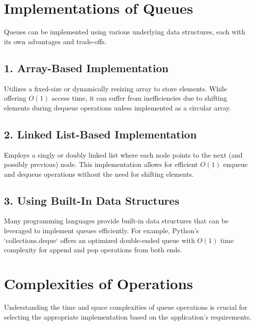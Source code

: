 \section{Implementations of Queues}

Queues can be implemented using various underlying data structures, each with its own advantages and trade-offs.

\subsection*{1. Array-Based Implementation}
Utilizes a fixed-size or dynamically resizing array to store elements. While offering \(O(1)\) access time, it can suffer from inefficiencies due to shifting elements during dequeue operations unless implemented as a circular array.

\subsection*{2. Linked List-Based Implementation}
Employs a singly or doubly linked list where each node points to the next (and possibly previous) node. This implementation allows for efficient \(O(1)\) enqueue and dequeue operations without the need for shifting elements.

\subsection*{3. Using Built-In Data Structures}
Many programming languages provide built-in data structures that can be leveraged to implement queues efficiently. For example, Python’s `collections.deque` offers an optimized double-ended queue with \(O(1)\) time complexity for append and pop operations from both ends.

\section{Complexities of Operations}

Understanding the time and space complexities of queue operations is crucial for selecting the appropriate implementation based on the application’s requirements.

